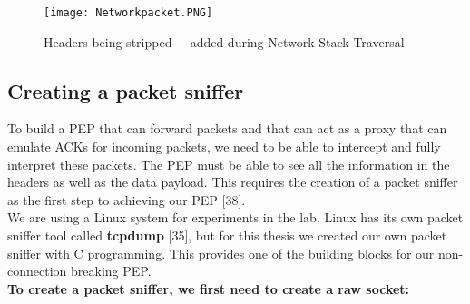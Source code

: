 \documentclass{uathesis}
\begin{document}
\begin{figure}[h!]
    \centering
    \texttt{[image: Networkpacket.PNG]}
    \caption{Headers being stripped + added during Network Stack Traversal
    }
    \label{fig:Socket}
\end{figure}

\subsection{Creating a packet sniffer}
To build a PEP that can forward packets and that can act as a proxy that can emulate ACKs for incoming packets, we need to be able to intercept and fully interpret these packets. The PEP must be able to see all the information in the headers as well as the data payload. This requires the creation of a packet sniffer as the first step to achieving our PEP [38]. \\

We are using a Linux system for experiments in the lab. Linux has its own packet sniffer tool called \textbf{tcpdump} [35], but for this thesis we created our own packet sniffer with C programming. This provides one of the building blocks for our non-connection breaking PEP. \\

\textbf{To create a packet sniffer, we first need to create a raw socket:} \\
\end{document}

